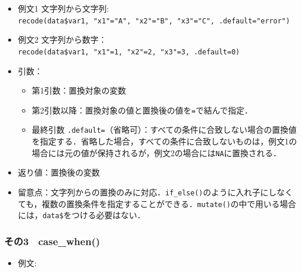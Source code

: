 \documentclass[
  xelatex, ja=standard]{bxjsarticle}
\newenvironment{Shaded}{\begin{snugshade}}{\end{snugshade}}
\newcommand{\ConstantTok}[1]{\textcolor[rgb]{0.56,0.35,0.01}{#1}}
\newcommand{\DecValTok}[1]{\textcolor[rgb]{0.00,0.00,0.81}{#1}}
\newcommand{\FunctionTok}[1]{\textcolor[rgb]{0.13,0.29,0.53}{\textbf{#1}}}
\newcommand{\NormalTok}[1]{#1}
\newcommand{\OtherTok}[1]{\textcolor[rgb]{0.56,0.35,0.01}{#1}}
\newcommand{\SpecialCharTok}[1]{\textcolor[rgb]{0.81,0.36,0.00}{\textbf{#1}}}
\newcommand{\StringTok}[1]{\textcolor[rgb]{0.31,0.60,0.02}{#1}}
\providecommand{\tightlist}{%
  \setlength{\itemsep}{0pt}\setlength{\parskip}{0pt}}
\begin{document}
\begin{itemize}
\tightlist
\item
  例文1 文字列から文字列:
  \texttt{recode(data\$var1,\ "x1"="A",\ "x2"="B",\ "x3"="C",\ .default="error")}
\item
  例文2
  文字列から数字：\texttt{recode(data\$var1,\ "x1"=1,\ "x2"=2,\ "x3"=3,\ .default=0)}
\item
  引数：

  \begin{itemize}
  \tightlist
  \item
    第1引数：置換対象の変数
  \item
    第2引数以降：置換対象の値と置換後の値を\texttt{=}で結んで指定．
  \item
    最終引数
    \texttt{.default=}（省略可）：すべての条件に合致しない場合の置換値を指定する．省略した場合，すべての条件に合致しないものは，例文1の場合には元の値が保持されるが，例文2の場合には\texttt{NA}に置換される．
  \end{itemize}
\item
  返り値：置換後の変数
\item
  留意点：文字列からの置換のみに対応．\texttt{if\_else()}のように入れ子にしなくても，複数の置換条件を指定することができる．\texttt{mutate()}の中で用いる場合には，\texttt{data\$}をつける必要はない．
\end{itemize}

\subsubsection{その3　case\_when()}\label{ux305dux306e3-case_when}

\begin{itemize}
\tightlist
\item
  例文:
\end{itemize}

\begin{Shaded}
\end{Shaded}
\end{document}
